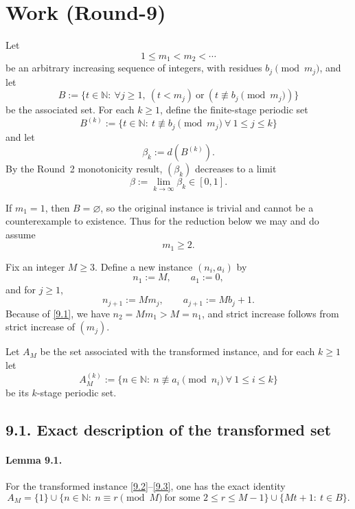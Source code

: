 \section{Work (Round-9)}
Let
\[
1\le m_1<m_2<\cdots
\]
be an arbitrary increasing sequence of integers, with residues $b_j\pmod{m_j}$, and let
\[
B:=\{t\in\mathbb N:\ \forall j\ge 1,\ (t<m_j)\ \text{or}\ (t\not\equiv b_j\!\!\pmod{m_j})\}
\]
be the associated set.  For each $k\ge 1$, define the finite-stage periodic set
\[
B^{(k)}:=\{t\in\mathbb N:\ t\not\equiv b_j\pmod{m_j}\ \forall\ 1\le j\le k\}
\]
and let
\[
\beta_k:=d(B^{(k)}).
\]
By the Round~2 monotonicity result, $(\beta_k)$ decreases to a limit
\[
\beta:=\lim_{k\to\infty}\beta_k\in[0,1].
\]

If $m_1=1$, then $B=\varnothing$, so the original instance is trivial and cannot be a counterexample to existence.  Thus for the reduction below we may and do assume
\begin{equation}
 m_1\ge 2.
\tag{9.1}
\end{equation}

Fix an integer $M\ge 3$.  Define a new instance $(n_i,a_i)$ by
\begin{equation}
 n_1:=M,\qquad a_1:=0,
\tag{9.2}
\end{equation}
and for $j\ge 1$,
\begin{equation}
 n_{j+1}:=Mm_j,
 \qquad
 a_{j+1}:=Mb_j+1.
\tag{9.3}
\end{equation}
Because of \eqref{9.1}, we have $n_2=Mm_1>M=n_1$, and strict increase follows from strict increase of $(m_j)$.

Let $A_M$ be the set associated with the transformed instance, and for each $k\ge 1$ let
\[
A_M^{(k)}:=\{n\in\mathbb N:\ n\not\equiv a_i\pmod{n_i}\ \forall\ 1\le i\le k\}
\]
be its $k$-stage periodic set.

\subsection*{9.1. Exact description of the transformed set}
\paragraph{Lemma 9.1.}
For the transformed instance \eqref{9.2}--\eqref{9.3}, one has the exact identity
\begin{equation}
A_M
=
\{1\}
\cup
\{n\in\mathbb N:\ n\equiv r\pmod M\ \text{for some }2\le r\le M-1\}
\cup
\{Mt+1:\ t\in B\}.
\tag{9.4}
\end{equation}


